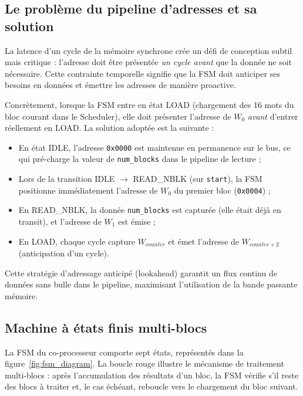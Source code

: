 \subsection{Le problème du pipeline d'adresses et sa solution}

La latence d'un cycle de la mémoire synchrone crée un défi de conception subtil mais critique : l'adresse doit être présentée \emph{un cycle avant} que la donnée ne soit nécessaire. Cette contrainte temporelle signifie que la FSM doit anticiper ses besoins en données et émettre les adresses de manière proactive.

Concrètement, lorsque la FSM entre en état LOAD (chargement des 16 mots du bloc courant dans le Scheduler), elle doit présenter l'adresse de $W_0$ \emph{avant} d'entrer réellement en LOAD. La solution adoptée est la suivante :

\begin{itemize}
    \item En état IDLE, l'adresse \texttt{0x0000} est maintenue en permanence sur le bus, ce qui pré-charge la valeur de \texttt{num\_blocks} dans le pipeline de lecture ;
    \item Lors de la transition IDLE $\rightarrow$ READ\_NBLK (sur \texttt{start}), la FSM positionne immédiatement l'adresse de $W_0$ du premier bloc (\texttt{0x0004}) ;
    \item En READ\_NBLK, la donnée \texttt{num\_blocks} est capturée (elle était déjà en transit), et l'adresse de $W_1$ est émise ;
    \item En LOAD, chaque cycle capture $W_{counter}$ et émet l'adresse de $W_{counter+2}$ (anticipation d'un cycle).
\end{itemize}

Cette stratégie d'adressage anticipé (lookahead) garantit un flux continu de données sans bulle dans le pipeline, maximisant l'utilisation de la bande passante mémoire.

\subsection{Machine à états finis multi-blocs}

La FSM du co-processeur comporte sept états, représentés dans la figure~\ref{fig:fsm_diagram}. La boucle rouge illustre le mécanisme de traitement multi-blocs : après l'accumulation des résultats d'un bloc, la FSM vérifie s'il reste des blocs à traiter et, le cas échéant, reboucle vers le chargement du bloc suivant.

